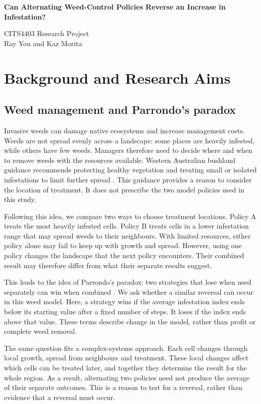 \documentclass[a4paper,11pt]{article}
\begin{document}
\begin{center}{\large\bfseries Can Alternating Weed-Control Policies Reverse an Increase in Infestation?}\end{center}

\begin{center}CITS4403 Research Project\\Ray You and Kaz Morita\end{center}

\section{Background and Research Aims}

\subsection{Weed management and Parrondo's paradox}

Invasive weeds can damage native ecosystems and increase management costs. Weeds are not spread evenly across a landscape: some places are heavily infested, while others have few weeds. Managers therefore need to decide where and when to remove weeds with the resources available. Western Australian bushland guidance recommends protecting healthy vegetation and treating small or isolated infestations to limit further spread \cite{bushland}. This guidance provides a reason to consider the location of treatment. It does not prescribe the two model policies used in this study.

Following this idea, we compare two ways to choose treatment locations. Policy A treats the most heavily infested cells. Policy B treats cells in a lower infestation range that may spread weeds to their neighbours. With limited resources, either policy alone may fail to keep up with growth and spread. However, using one policy changes the landscape that the next policy encounters. Their combined result may therefore differ from what their separate results suggest.

This leads to the idea of Parrondo's paradox: two strategies that lose when used separately can win when combined \cite{parrondo}. We ask whether a similar reversal can occur in this weed model. Here, a strategy wins if the average infestation index ends below its starting value after a fixed number of steps. It loses if the index ends above that value. These terms describe change in the model, rather than profit or complete weed removal.

The same question fits a complex-systems approach. Each cell changes through local growth, spread from neighbours and treatment. These local changes affect which cells can be treated later, and together they determine the result for the whole region. As a result, alternating two policies need not produce the average of their separate outcomes. This is a reason to test for a reversal, rather than evidence that a reversal must occur.
\end{document}
